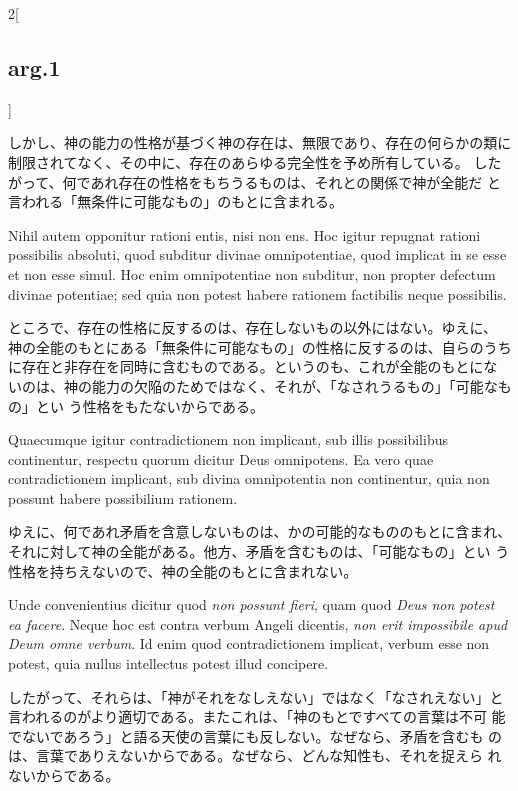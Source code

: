 \documentclass[paper=a4paper,fontsize=10pt,jafontsize=9pt,titlepage]{jlreq}
\begin{document}
\begin{paracol}{2}[\subsection{arg.1}]
\switchcolumn

しかし、神の能力の性格が基づく神の存在は、無限であり、存在の何らかの類に
 制限されてなく、その中に、存在のあらゆる完全性を予め所有している。
したがって、何であれ存在の性格をもちうるものは、それとの関係で神が全能だ
 と言われる「無条件に可能なもの」のもとに含まれる。

\switchcolumn*

Nihil autem opponitur rationi
entis, nisi non ens. 
Hoc igitur repugnat rationi possibilis absoluti,
quod subditur divinae omnipotentiae, quod implicat in se esse et non
esse simul. Hoc enim omnipotentiae non subditur, non propter defectum
divinae potentiae; sed quia non potest habere rationem factibilis neque
possibilis.

\switchcolumn

ところで、存在の性格に反するのは、存在しないもの以外にはない。ゆえに、
神の全能のもとにある「無条件に可能なもの」の性格に反するのは、自らのうち
 に存在と非存在を同時に含むものである。というのも、これが全能のもとにな
 いのは、神の能力の欠陥のためではなく、それが、「なされうるもの」「可能なもの」とい
 う性格をもたないからである。

\switchcolumn*

Quaecumque igitur contradictionem non implicant, sub illis
possibilibus continentur, respectu quorum dicitur Deus omnipotens. Ea
vero quae contradictionem implicant, sub divina omnipotentia non
continentur, quia non possunt habere possibilium rationem.

\switchcolumn

ゆえに、何であれ矛盾を含意しないものは、かの可能的なもののもとに含まれ、
 それに対して神の全能がある。他方、矛盾を含むものは、「可能なもの」とい
 う性格を持ちえないので、神の全能のもとに含まれない。

\switchcolumn*

Unde
convenientius dicitur quod {\itshape non possunt fieri}, quam quod {\itshape Deus non potest
ea facere}. Neque hoc est contra verbum Angeli dicentis, {\itshape non erit
impossibile apud Deum omne verbum}. Id enim quod contradictionem
implicat, verbum esse non potest, quia nullus intellectus potest illud
concipere.

\switchcolumn

したがって、それらは、「神がそれをなしえない」ではなく「なされえない」と
 言われるのがより適切である。またこれは、「神のもとですべての言葉は不可
 能でないであろう」と語る天使の言葉にも反しない。なぜなら、矛盾を含むも
 のは、言葉でありえないからである。なぜなら、どんな知性も、それを捉えら
 れないからである。


\end{paracol}
\end{document}

